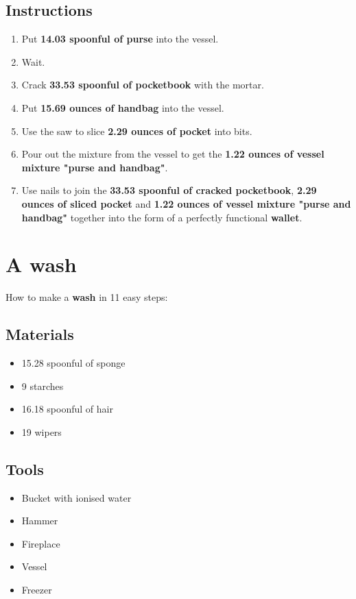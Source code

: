 \documentclass{article}
\begin{document}
\subsection{Instructions}\begin{enumerate}
\item 
Put \textbf{14.03 spoonful of purse} into the vessel.
\item 
Wait.
\item 
Crack \textbf{33.53 spoonful of pocketbook} with the mortar.
\item 
Put \textbf{15.69 ounces of handbag} into the vessel.
\item 
Use the saw to slice \textbf{2.29 ounces of pocket} into bits.
\item 
Pour out the mixture from the vessel to get the \textbf{1.22 ounces of vessel mixture "purse and handbag"}.
\item 
Use nails to join the \textbf{33.53 spoonful of cracked pocketbook}, \textbf{2.29 ounces of sliced pocket} and \textbf{1.22 ounces of vessel mixture "purse and handbag"} together into the form of a perfectly functional \textbf{wallet}.
\end{enumerate}
\newpage
\section{A wash}How to make a \textbf{wash} in 11 easy steps:

\subsection{Materials}\begin{itemize}
\item 
15.28 spoonful of sponge
\item 
9 starches
\item 
16.18 spoonful of hair
\item 
19 wipers
\end{itemize}
\subsection{Tools}\begin{itemize}
\item 
Bucket with ionised water
\item 
Hammer
\item 
Fireplace
\item 
Vessel
\item 
Freezer
\end{itemize}
\end{document}
